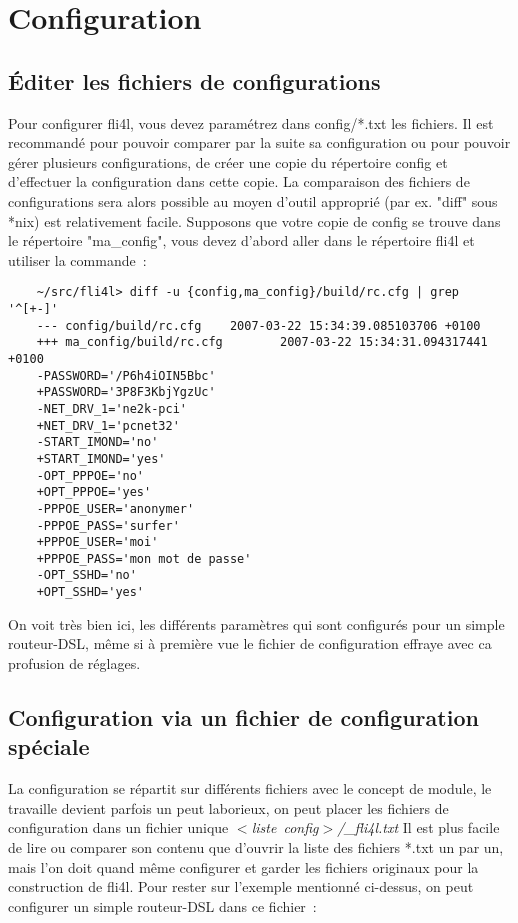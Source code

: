\section{Configuration}

\subsection{Éditer les fichiers de configurations}

Pour configurer fli4l, vous devez paramétrez dans config/*.txt les fichiers.
Il est recommandé pour pouvoir comparer par la suite sa configuration ou pour
pouvoir gérer plusieurs configurations, de créer une copie du répertoire config
et d'effectuer la configuration dans cette copie. La comparaison des fichiers
de configurations sera alors possible au moyen d'outil approprié (par ex. "diff"
sous *nix) est relativement facile. Supposons que votre copie de config se trouve
dans le répertoire "ma\_config", vous devez d'abord aller dans le répertoire
fli4l et utiliser la commande~:

\begin{example}
\begin{verbatim}
    ~/src/fli4l> diff -u {config,ma_config}/build/rc.cfg | grep '^[+-]'
    --- config/build/rc.cfg    2007-03-22 15:34:39.085103706 +0100
    +++ ma_config/build/rc.cfg        2007-03-22 15:34:31.094317441 +0100
    -PASSWORD='/P6h4iOIN5Bbc'
    +PASSWORD='3P8F3KbjYgzUc'
    -NET_DRV_1='ne2k-pci'
    +NET_DRV_1='pcnet32'
    -START_IMOND='no'
    +START_IMOND='yes'
    -OPT_PPPOE='no'
    +OPT_PPPOE='yes'
    -PPPOE_USER='anonymer'
    -PPPOE_PASS='surfer'
    +PPPOE_USER='moi'
    +PPPOE_PASS='mon mot de passe'
    -OPT_SSHD='no'
    +OPT_SSHD='yes'
\end{verbatim}
\end{example}

On voit très bien ici, les différents paramètres qui sont configurés pour un
simple routeur-DSL, même si à première vue le fichier de configuration effraye
avec ca profusion de réglages.

\subsection{Configuration via un fichier de configuration spéciale}

La configuration se répartit sur différents fichiers avec le concept de module,
le travaille devient parfois un peut laborieux, on peut placer les fichiers de
configuration dans un fichier unique \emph{$<$liste~config$>$/\_fli4l.txt}
Il est plus facile de lire ou comparer son contenu que d'ouvrir la liste des
fichiers *.txt un par un, mais l'on doit quand même configurer et garder les
fichiers originaux pour la construction de fli4l. Pour rester sur l'exemple
mentionné ci-dessus, on peut configurer un simple routeur-DSL dans ce fichier~:

